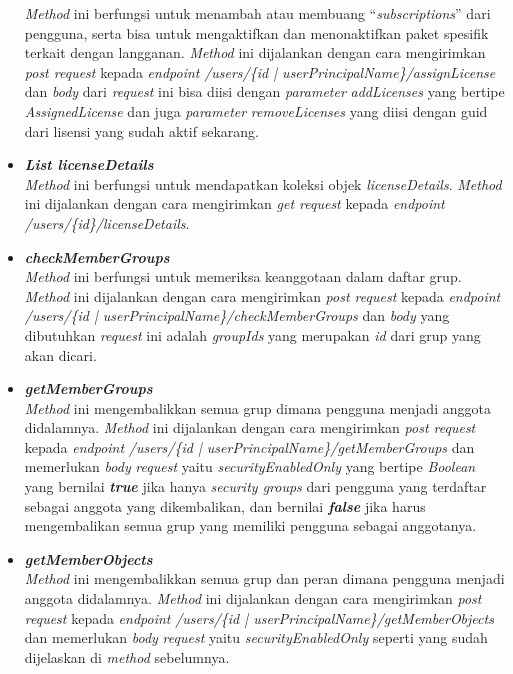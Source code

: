 \begin{itemize}
	\textit{Method} ini berfungsi untuk menambah atau membuang ``\textit{subscriptions}'' dari pengguna, serta bisa untuk mengaktifkan dan menonaktifkan paket spesifik terkait dengan langganan. \textit{Method} ini dijalankan dengan cara mengirimkan \textit{post request} kepada \textit{endpoint} \textit{/users/\{id | userPrincipalName\}/assignLicense} dan \textit{body} dari \textit{request} ini bisa diisi dengan \textit{parameter} \textit{addLicenses} yang bertipe \textit{AssignedLicense} dan juga \textit{parameter} \textit{removeLicenses} yang diisi dengan guid dari lisensi yang sudah aktif sekarang.
	\item \textbf{\textit{List licenseDetails}}\\
	\textit{Method} ini berfungsi untuk mendapatkan koleksi objek \textit{licenseDetails}. \textit{Method} ini dijalankan dengan cara mengirimkan \textit{get request} kepada \textit{endpoint} \textit{/users/\{id\}/licenseDetails}.
	\item \textbf{\textit{checkMemberGroups}}\\
	\textit{Method} ini berfungsi untuk memeriksa keanggotaan dalam daftar grup. \textit{Method} ini dijalankan dengan cara mengirimkan \textit{post request} kepada \textit{endpoint} \textit{/users/\{id | userPrincipalName\}/checkMemberGroups} dan \textit{body} yang dibutuhkan \textit{request} ini adalah \textit{groupIds} yang merupakan \textit{id} dari grup yang akan dicari.
	\item \textbf{\textit{getMemberGroups}}\\
	\textit{Method} ini mengembalikkan semua grup dimana pengguna menjadi anggota didalamnya. \textit{Method} ini dijalankan dengan cara mengirimkan \textit{post request} kepada \textit{endpoint} \textit{/users/\{id | userPrincipalName\}/getMemberGroups} dan memerlukan \textit{body} \textit{request} yaitu \textit{securityEnabledOnly} yang bertipe \textit{Boolean} yang bernilai \textit{\textbf{true}} jika hanya \textit{security groups} dari pengguna yang terdaftar sebagai anggota yang dikembalikan, dan bernilai \textit{\textbf{false}} jika harus mengembalikan semua grup yang memiliki pengguna sebagai anggotanya.
	\item \textbf{\textit{getMemberObjects}}\\
	\textit{Method} ini mengembalikkan semua grup dan peran dimana pengguna menjadi anggota didalamnya. \textit{Method} ini dijalankan dengan cara mengirimkan \textit{post request} kepada \textit{endpoint} \textit{/users/\{id | userPrincipalName\}/getMemberObjects} dan memerlukan \textit{body} \textit{request} yaitu \textit{securityEnabledOnly} seperti yang sudah dijelaskan di \textit{method} sebelumnya.

\end{itemize}
